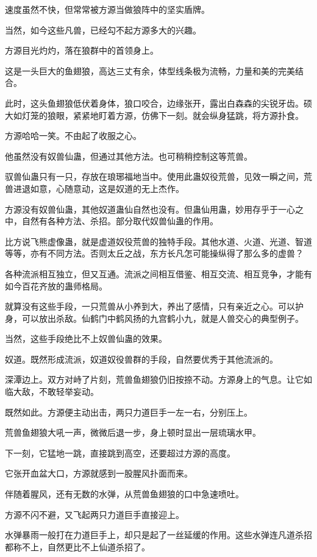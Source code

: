 \begin{this_body}
速度虽然不快，但常常被方源当做狼阵中的坚实盾牌。

当然，如今这些凡兽，已经勾不起方源多大的兴趣。

方源目光灼灼，落在狼群中的首领身上。

这是一头巨大的鱼翅狼，高达三丈有余，体型线条极为流畅，力量和美的完美结合。

此时，这头鱼翅狼低伏着身体，狼口咬合，边缘张开，露出白森森的尖锐牙齿。硕大如灯笼的狼眼，紧紧地盯着方源，仿佛下一刻。就会纵身猛跳，将方源扑食。

方源哈哈一笑。不由起了收服之心。

他虽然没有奴兽仙蛊，但通过其他方法。也可稍稍控制这等荒兽。

驭兽仙蛊只有一只，存放在琅琊福地当中。使用此蛊奴役荒兽，见效一瞬之间，荒兽进退如意，心随意动，这是奴道的无上杰作。

方源没有奴兽仙蛊，其他奴道蛊仙自然也没有。但蛊仙用蛊，妙用存乎于一心之中，自然有各种方法、杀招。部分取代奴兽仙蛊的作用。

比方说飞熊虚像蛊，就是虚道奴役荒兽的独特手段。其他水道、火道、光道、智道等等，亦有不同方法。否则太丘之战，东方长凡怎可能操纵得了那么多的虚兽？

各种流派相互独立，但又互通。流派之间相互借鉴、相互交流、相互竞争，才能有如今百花齐放的蛊师格局。

就算没有这些手段，一只荒兽从小养到大，养出了感情，只有亲近之心。可以护身，可以放出杀敌。仙鹤门中鹤风扬的九宫鹤小九，就是人兽交心的典型例子。

当然，这些手段绝比不上奴兽仙蛊的效果。

奴道。既然形成流派，奴道奴役兽群的手段，自然要优秀于其他流派的。

深潭边上。双方对峙了片刻，荒兽鱼翅狼仍旧按捺不动。方源身上的气息。让它如临大敌，不敢轻举妄动。

既然如此。方源便主动出击，两只力道巨手一左一右，分别压上。

荒兽鱼翅狼大吼一声，微微后退一步，身上顿时显出一层琉璃水甲。

下一刻，它猛地一跳，直接跳到高空，还要超过方源的高度。

它张开血盆大口，方源就感到一股腥风扑面而来。

伴随着腥风，还有无数的水弹，从荒兽鱼翅狼的口中急速喷吐。

方源不闪不避，又飞起两只力道巨手直接迎上。

水弹暴雨一般打在力道巨手上，却只是起了一丝延缓的作用。这些水弹连凡道杀招都称不上，自然更比不上仙道杀招了。


\end{this_body}
